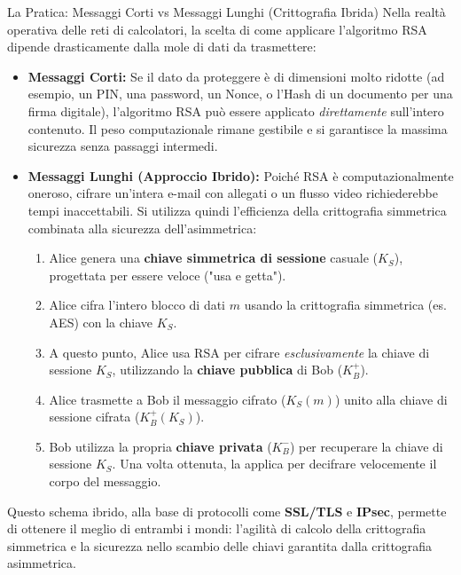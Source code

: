 \documentclass[a4paper,12pt]{report}
\begin{document}
\begin{esempiobox}{La Pratica: Messaggi Corti vs Messaggi Lunghi (Crittografia Ibrida)}
Nella realtà operativa delle reti di calcolatori, la scelta di come applicare l'algoritmo RSA dipende drasticamente dalla mole di dati da trasmettere:

\begin{itemize}
    \item \textbf{Messaggi Corti:} Se il dato da proteggere è di dimensioni molto ridotte (ad esempio, un PIN, una password, un Nonce, o l'Hash di un documento per una firma digitale), l'algoritmo RSA può essere applicato \textit{direttamente} sull'intero contenuto. Il peso computazionale rimane gestibile e si garantisce la massima sicurezza senza passaggi intermedi.
    
    \item \textbf{Messaggi Lunghi (Approccio Ibrido):} Poiché RSA è computazionalmente oneroso, cifrare un'intera e-mail con allegati o un flusso video richiederebbe tempi inaccettabili. Si utilizza quindi l'efficienza della crittografia simmetrica combinata alla sicurezza dell'asimmetrica:
    \begin{enumerate}
        \item Alice genera una \textbf{chiave simmetrica di sessione} casuale ($K_S$), progettata per essere veloce ("usa e getta").
        \item Alice cifra l'intero blocco di dati $m$ usando la crittografia simmetrica (es. AES) con la chiave $K_S$.
        \item A questo punto, Alice usa RSA per cifrare \textit{esclusivamente} la chiave di sessione $K_S$, utilizzando la \textbf{chiave pubblica} di Bob ($K_B^+$).
        \item Alice trasmette a Bob il messaggio cifrato ($K_S(m)$) unito alla chiave di sessione cifrata ($K_B^+(K_S)$).
        \item Bob utilizza la propria \textbf{chiave privata} ($K_B^-$) per recuperare la chiave di sessione $K_S$. Una volta ottenuta, la applica per decifrare velocemente il corpo del messaggio.
    \end{enumerate}
\end{itemize}

Questo schema ibrido, alla base di protocolli come \textbf{SSL/TLS} e \textbf{IPsec}, permette di ottenere il meglio di entrambi i mondi: l'agilità di calcolo della crittografia simmetrica e la sicurezza nello scambio delle chiavi garantita dalla crittografia asimmetrica.
\end{esempiobox}
\end{document}
